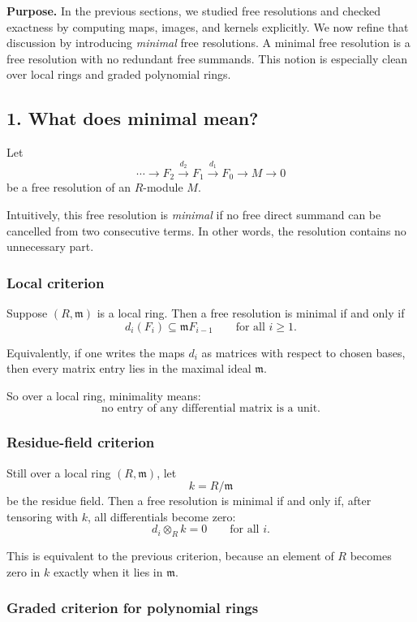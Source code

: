 \documentclass[12pt,a4paper]{article}
\theoremstyle{notespace}
\theoremstyle{definition}
\begin{document}
\textbf{Purpose.}
In the previous sections, we studied free resolutions and checked exactness by computing maps, images, and kernels explicitly.
We now refine that discussion by introducing \emph{minimal} free resolutions.
A minimal free resolution is a free resolution with no redundant free summands.
This notion is especially clean over local rings and graded polynomial rings.

\subsection{1. What does minimal mean?}

Let
\[
\cdots \longrightarrow F_2 \xrightarrow{d_2} F_1 \xrightarrow{d_1} F_0 \longrightarrow M \longrightarrow 0
\]
be a free resolution of an \(R\)-module \(M\).

Intuitively, this free resolution is \emph{minimal} if no free direct summand can be cancelled from two consecutive terms.
In other words, the resolution contains no unnecessary part.

\subsubsection*{Local criterion}

Suppose \((R,\mathfrak m)\) is a local ring.
Then a free resolution is minimal if and only if
\[
d_i(F_i)\subseteq \mathfrak m F_{i-1}
\qquad\text{for all } i\geq 1.
\]

Equivalently, if one writes the maps \(d_i\) as matrices with respect to chosen bases, then every matrix entry lies in the maximal ideal \(\mathfrak m\).

So over a local ring, minimality means:
\[
\text{no entry of any differential matrix is a unit.}
\]

\subsubsection*{Residue-field criterion}

Still over a local ring \((R,\mathfrak m)\), let
\[
k=R/\mathfrak m
\]
be the residue field.
Then a free resolution is minimal if and only if, after tensoring with \(k\), all differentials become zero:
\[
d_i\otimes_R k = 0 \qquad\text{for all } i.
\]

This is equivalent to the previous criterion, because an element of \(R\) becomes zero in \(k\) exactly when it lies in \(\mathfrak m\).

\subsubsection*{Graded criterion for polynomial rings}
\end{document}
